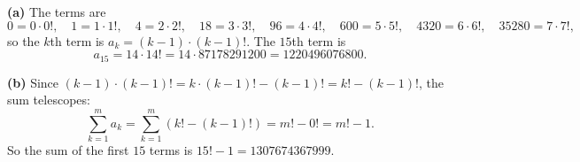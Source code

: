 \textbf{(a)} The terms are
\[0=0\cdot0!,\quad1=1\cdot1!,\quad4=2\cdot2!,\quad18=3\cdot3!,\quad96=4\cdot4!,\quad600=5\cdot5!,\quad4320=6\cdot6!,\quad35280=7\cdot7!,\]
so the $k$th term is $a_k=(k-1)\cdot(k-1)!$. The $15$th term is
\[a_{15}=14\cdot14!=14\cdot87178291200=\boxed{1220496076800}.\]

\textbf{(b)} Since $(k-1)\cdot(k-1)!=k\cdot(k-1)!-(k-1)!=k!-(k-1)!$, the sum telescopes:
\[\sum_{k=1}^{m}a_k=\sum_{k=1}^{m}\left(k!-(k-1)!\right)=m!-0!=m!-1 .\]
So the sum of the first $15$ terms is $15!-1=\boxed{1307674367999}$.
